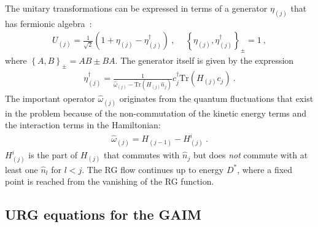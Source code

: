 \documentclass[reprint,superscriptaddress,floatfix]{revtex4-2}
\begin{document}
The unitary transformations can be expressed in terms of a generator \(\eta_{(j)}\) that has fermionic algebra~\cite{anirbanurg1,anirbanurg2}:
\begin{equation}\begin{aligned}
	U_{(j)} = \frac{1}{\sqrt 2}\left(1 + \eta_{(j)} - \eta_{(j)}^\dagger\right)~,~ \quad\left\{ \eta_{(j)},\eta_{(j)}^\dagger \right\}_\pm = 1~,
\end{aligned}\end{equation}
where \(\left\{A,B\right\}_\pm = AB \pm BA\). The generator itself is given by the expression~\cite{anirbanurg1,anirbanurg2}
\begin{equation}\begin{aligned}
	\eta^\dagger_{(j)} = \frac{1}{\hat \omega_{(j)} - \text{Tr}\left(H_{(j)} \hat n_{j}\right) } c^\dagger_{j} \text{Tr}\left(H_{(j)}c_{j}\right)~.
\end{aligned}\end{equation}
The important operator \(\hat \omega_{(j)}\) originates from the quantum fluctuations that exist in the problem because of the non-commutation of the kinetic energy terms and the interaction terms in the Hamiltonian:
\begin{equation}\begin{aligned}
	\hat \omega_{(j)} = H_{(j-1)} - H^i_{(j)}~.
\end{aligned}\end{equation}
\(H^i_{(j)}\) is the part of \(H_{(j)}\) that commutes with \(\hat n_j\) but does {\it not} commute with at least one \(\hat n_l\) for \(l < j\). The RG flow continues up to energy \(D^*\), where a fixed point is reached from the vanishing of the RG function. 

\subsection{URG equations for the GAIM}
\end{document}
